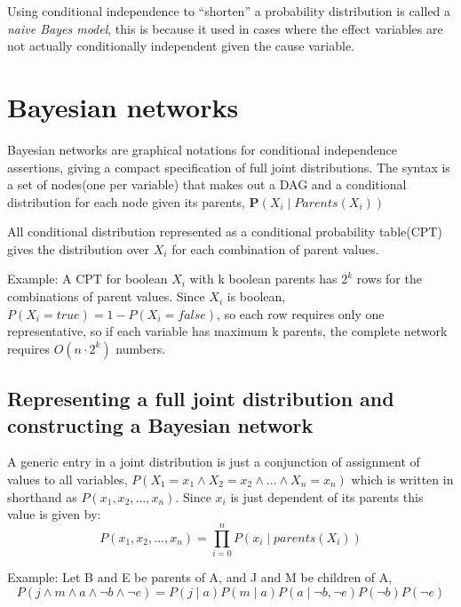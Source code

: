 \documentclass[11pt, letterpaper]{report}
\numberwithin{equation}{section}
\begin{document}
Using conditional independence to ``shorten'' a probability distribution is
called a \emph{naive Bayes model}, this is because it used in cases where the
effect variables are not actually conditionally independent given the cause
variable.

\section{Bayesian networks}


Bayesian networks are graphical notations for conditional independence
assertions, giving a compact specification of full joint distributions.
The syntax is a set of nodes(one per variable) that makes out a DAG and a conditional
distribution for each node given its parents, $\boldsymbol{P}(X_i \mid Parents(X_i))$

All conditional distribution represented as a conditional probability
table(CPT) gives the distribution over $X_i$ for each combination of parent
values.

Example: A CPT for boolean $X_i$ with k boolean parents has $2^k$ rows for the
combinations of parent values. Since $X_i$ is boolean, $P(X_i = true) = 1 - P(X_i
= false)$, so each row requires only one representative, so if each variable has
maximum k parents, the complete network requires $O(n \cdot 2^k)$ numbers.

\subsection*{Representing a full joint distribution and constructing a Bayesian network}

A generic entry in a joint distribution is just a conjunction of assignment of
values to all variables, $P(X_1 = x_1 \wedge X_2 = x_2 \wedge ... \wedge X_n =
x_n)$ which is written in shorthand as $P(x_1, x_2,...,x_n)$. Since $x_i$ is
just dependent of its parents this value is given by:
\begin{equation}
  \label{eq:parents}
  P(x_1, x_2,..., x_n) = \prod_{i=0}^n P(x_i \mid parents(X_i))
\end{equation}

Example: Let B and E be parents of A, and J and M be children of A,
\begin{equation}
    P(j \wedge m \wedge a \wedge \neg b \wedge \neg e) =
    P(j \mid a)P(m \mid a)P(a \mid \neg b, \neg e)P(\neg b)P(\neg e)
\end{equation}
\end{document}
